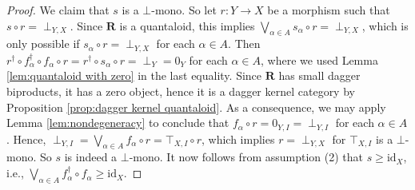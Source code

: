 \documentclass[12pt]{tac}
\theoremstyle{definition}
\theoremstyle{remark}
\newcommand{\<}{\langle}
\renewcommand{\>}{\rangle}
\renewcommand{\:}{\colon}
\newcommand{\id}{\mathrm{id}}
\begin{document}
\begin{proof}
We claim that $s$ is a $\bot$-mono. So let $r:Y\to X$ be a morphism such that $s\circ r=\perp_{Y,X}$. Since $\mathbf R$ is a quantaloid, this implies $\bigvee_{\alpha\in A}s_\alpha\circ r=\perp_{Y,X}$, which is only possible if $s_\alpha\circ r=\perp_{Y,X}$ for each $\alpha\in A$. Then $r^\dag\circ f_\alpha^\dag\circ f_\alpha\circ r=r^\dag\circ s_\alpha\circ r=\perp_Y=0_Y$ for each $\alpha\in A$, where we used Lemma \ref{lem:quantaloid with zero} in the last equality. Since $\mathbf R$ has small dagger biproducts, it has a zero object, hence it is a dagger kernel category by Proposition \ref{prop:dagger kernel quantaloid}. As a consequence, we may apply Lemma \ref{lem:nondegeneracy} to conclude that $f_\alpha\circ r=0_{Y,I}=\perp_{Y,I}$ for each $\alpha\in A$. Hence, $\perp_{Y,I}=\bigvee_{\alpha\in A}f_\alpha\circ r=\top_{X,I}\circ r$, which implies $r=\perp_{Y,X}$ for $\top_{X,I}$ is a $\bot$-mono. So $s$ is indeed a $\bot$-mono. It now follows from assumption (2) that $s\geq\id_X$, i.e., $\bigvee_{\alpha\in A}f_\alpha^\dag\circ f_\alpha\geq\id_X$.
\end{proof}
\end{document}
